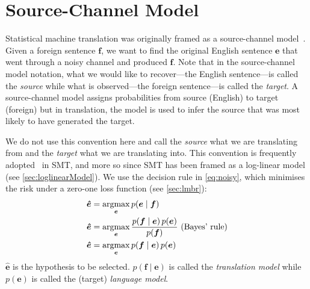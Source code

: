 \section{Source-Channel Model}
\label{sec:sourceChannelModel}




Statistical machine translation was originally framed as a source-channel
model~\citep{shannon:1948:BellSystemTechnicalJournal,brown-cocke-dellapietra-dellapietra-jelinek-lafferty-mercer-roossin:1990:CL,brown-dellapietra-dellapietra-mercer-1993}.
Given a
foreign sentence $\bm{f}$, we want to find the original English sentence
$\bm{e}$ that went through a noisy channel and produced $\bm{f}$. Note that in
the source-channel model notation, what we would like to
recover---the English sentence---is
called the \emph{source} while what is observed---the foreign sentence---is
called the \emph{target}. A source-channel model assigns probabilities
from source (English) to target (foreign) but in translation, the model
is used to infer the source that was most likely to have generated
the target.

We do not use this convention here and call the
\emph{source} what we are translating from and the \emph{target} what we are
translating into. This convention is frequently
adopted~\citep{och-tillmann-ney:1999:EMNLP,och-ney:2002:ACL,och-ney:2004:CL}
in SMT,
and more so since SMT has been framed as a log-linear
model (see \autoref{sec:loglinearModel}). We use the
decision rule in \autoref{eq:noisy}, which minimises the risk under
a zero-one loss function (see \autoref{sec:lmbr}):
%
\begin{align}
  \bm{\hat{e}} &= \operatorname*{argmax}_{\bm{e}} p(\bm{e} \mid \bm{f}) \nonumber \\
  \bm{\hat{e}} &= \operatorname*{argmax}_{\bm{e}} \frac{p(\bm{f} \mid \bm{e}) \, p(\bm{e})}{p(\bm{f})} \mbox{ (Bayes' rule)} \nonumber \\
  \bm{\hat{e}} &= \operatorname*{argmax}_{\bm{e}} p(\bm{f} \mid \bm{e}) \, p(\bm{e}) \label{eq:noisy}
\end{align}
%
$\bm{\hat{e}}$ is the hypothesis to be selected.
$p(\bm{f} \mid \bm{e})$ is called the \emph{translation model} while
$p(\bm{e})$ is called the (target) \emph{language model}.

